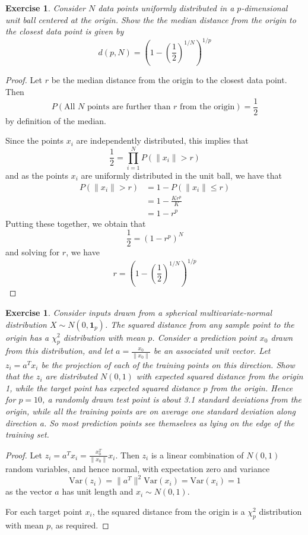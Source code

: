 \documentclass[12pt]{amsart}
\theoremstyle{plain}%
\newtheorem{exer}[thm]{Exercise}
\theoremstyle{definition}
\theoremstyle{remark}
\begin{document}
\begin{exer}
    Consider $N$ data points uniformly distributed in a $p$-dimensional unit ball centered at the origin.  Show the the median distance from the origin to the closest data point is given by \[
        d(p, N) = \left(1-\left(\frac{1}{2}\right)^{1/N}\right)^{1/p}
    \] 
\end{exer}
\begin{proof}
    Let $r$ be the median distance from the origin to the closest data point.  Then \[
        P(\text{All $N$ points are further than $r$ from the origin}) = \frac{1}{2}
    \] by definition of the median.

    Since the points $x_i$ are independently distributed, this implies that \[
        \frac{1}{2} = \prod_{i=1}^N P(\|x_i\| > r)
    \] and as the points $x_i$ are uniformly distributed in the unit ball, we have that \begin{align*}
        P(\| x_i \| > r) &= 1 - P(\| x_i \| \leq r) \\
                         &= 1 - \frac{Kr^p}{K} \\
                         &= 1 - r^p
    \end{align*}  Putting these together, we obtain that \[
        \frac{1}{2} = \left(1-r^p \right)^{N}
    \] and solving for $r$, we have \[
        r = \left(1-\left(\frac{1}{2}\right)^{1/N}\right)^{1/p}
    \]
\end{proof}

\begin{exer}
    Consider inputs drawn from a spherical multivariate-normal distribution $X \sim N(0,\mathbf{1}_p)$. The squared distance from any sample point to the origin has a $\chi^2_p$ distribution with mean $p$. Consider a prediction point $x_0$ drawn from this distribution, and let $a = \frac{x_0}{\| x_0\|}$ be an associated unit vector. Let $z_i = a^T x_i$ be the projection of each of the training points on this direction.
    Show that the $z_i$ are distributed $N(0,1)$ with expected squared distance from the origin 1, while the target point has expected squared distance $p$ from the origin.
    Hence for $p = 10$, a randomly drawn test point is about 3.1 standard deviations from the origin, while all the training points are on average one standard deviation along direction a. So most prediction points see themselves as lying on the edge of the training set.
\end{exer}

\begin{proof}
    Let $z_i = a^T x_i = \frac{x_0^T}{\| x_0 \|} x_i$.  Then $z_i$ is a linear combination of $N(0,1)$ random variables, and hence normal, with expectation zero and variance \[ 
        \text{Var}(z_i) = \| a^T \|^2 \text{Var}(x_i) = \text{Var}(x_i) = 1
    \] as the vector $a$ has unit length and $x_i \sim N(0, 1)$.
    
    For each target point $x_i$, the squared distance from the origin is a $\chi^2_p$ distribution with mean $p$, as required.  
\end{proof}
\end{document}
